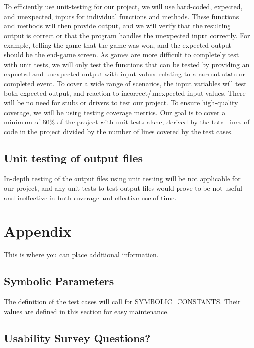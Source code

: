 \documentclass[12pt, titlepage]{article}
\begin{document}
To efficiently use unit-testing for our project, we will use hard-coded, expected, and unexpected, inputs for individual functions and methods. These functions and methods will then provide output, and we will verify that the resulting output is correct or that the program handles the unexpected input correctly. For example, telling the game that the game was won, and the expected output should be the end-game screen. As games are more difficult to completely test with unit tests, we will only test the functions that can be tested by providing an expected and unexpected output with input values relating to a current state or completed event. To cover a wide range of scenarios, the input variables will test both expected output, and reaction to incorrect/unexpected input values. There will be no need for stubs or drivers to test our project. To ensure high-quality coverage, we will be using testing coverage metrics. Our goal is to cover a minimum of 60\% of the project with unit tests alone, derived by the total lines of code in the project divided by the number of lines covered by the test cases.
	
\subsection{Unit testing of output files}	

In-depth testing of the output files using unit testing will be not applicable for our project, and any unit tests to test output files would prove to be not useful and ineffective in both coverage and effective use of time.





\newpage

\section{Appendix}

This is where you can place additional information.

\subsection{Symbolic Parameters}

The definition of the test cases will call for SYMBOLIC\_CONSTANTS.
Their values are defined in this section for easy maintenance.

\subsection{Usability Survey Questions?}
\end{document}
